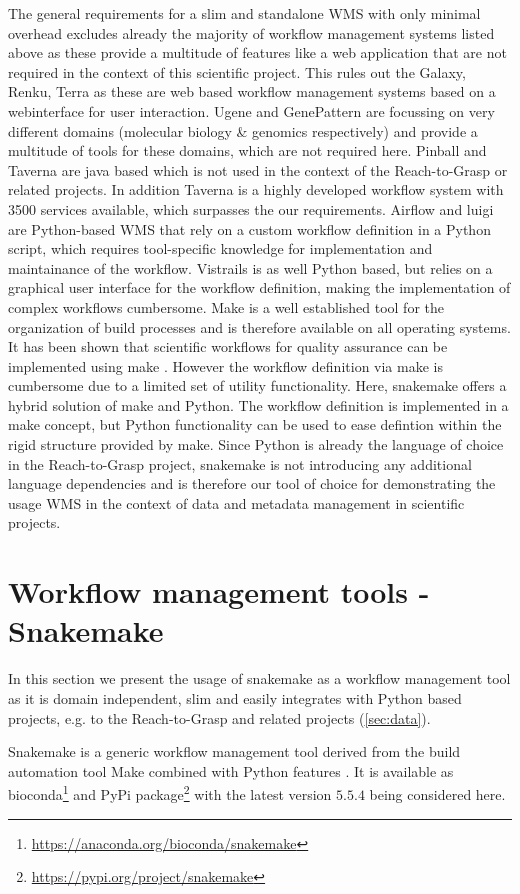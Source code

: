 The general requirements for a slim and standalone WMS with only minimal overhead excludes already the majority of workflow management systems listed above as these provide a multitude of features like a web application that are not required in the context of this scientific project. This rules out the Galaxy, Renku, Terra as these are web based workflow management systems based on a webinterface for user interaction. Ugene and GenePattern are focussing on very different domains (molecular biology \& genomics respectively) and provide a multitude of tools for these domains, which are not required here. Pinball and Taverna are java based which is not used in the context of the Reach-to-Grasp or related projects.  In addition Taverna is a highly developed workflow system with 3500 services available, which surpasses the our requirements. Airflow and luigi are Python-based WMS that rely on a custom workflow definition in a Python script, which requires tool-specific knowledge for implementation and maintainance of the workflow. Vistrails is as well Python based, but relies on a graphical user interface for the workflow definition, making the implementation of complex workflows cumbersome. Make is a well established tool for the organization of build processes and is therefore available on all operating systems. It has been shown that scientific workflows for quality assurance can be implemented using make \citep{Askren_2016}. However the workflow definition via make is cumbersome due to a limited set of utility functionality. Here, snakemake offers a hybrid solution of make and Python. The workflow definition is implemented in a make concept, but Python functionality can be used to ease defintion within the rigid structure provided by make. Since Python is already the language of choice in the Reach-to-Grasp project, snakemake is not introducing any additional language dependencies and is therefore our tool of choice for demonstrating the usage WMS in the context of data and metadata management in scientific projects.


\section{Workflow management tools - Snakemake}
\label{sec:snakemake}
In this section we present the usage of snakemake as a workflow management tool as it is domain independent, slim and easily integrates with Python based projects, e.g. to the Reach-to-Grasp and related projects (\cref{sec:data}).

Snakemake is a generic workflow management tool derived from the build automation tool Make combined with Python features \citep{Koster_2012}. It is available as bioconda\footnote{\url{https://anaconda.org/bioconda/snakemake}} and PyPi package\footnote{\url{https://pypi.org/project/snakemake}} with the latest version $5.5.4$ being considered here.

